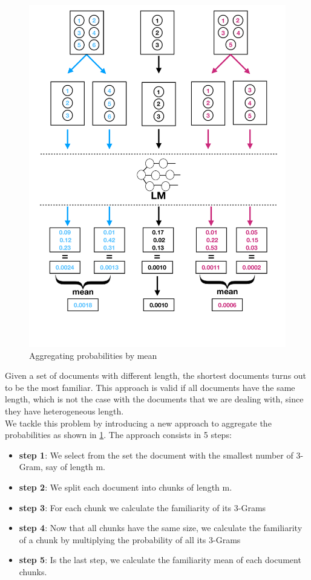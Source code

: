 \documentclass[12pt,mscthesis]{usiinfthesis}
\begin{document}
			\begin{figure}[htbp]
			\centering
			\includegraphics[width=\textwidth]{aggregation-by-mean}
			\caption{Aggregating probabilities by mean}
			\label{aggregation-by-mean}
			\end{figure}
		
		Given a set of documents with different length, the shortest documents turns out to be the most familiar. This approach is valid if all documents have the same length, which is not the case with the documents that we are dealing with, since they have heterogeneous length. \\
		We tackle this problem by introducing a new approach to aggregate the probabilities as shown in \cref{aggregation-by-mean}.
		The approach consists in 5 steps: 
		\begin{itemize}
			\item \textbf{step 1}: We select from the set the document with the smallest number of 3-Gram, say of length m.
			\item \textbf{step 2}: We split each document into chunks of length m.
			\item \textbf{step 3}: For each chunk we calculate the familiarity of its 3-Grams
			\item \textbf{step 4}: Now that all chunks have the same size, we calculate the familiarity of a chunk by multiplying the probability of all its 3-Grams
			\item \textbf{step 5}: Is the last step, we calculate the familiarity mean of each document chunks.
		\end{itemize}
\end{document}
